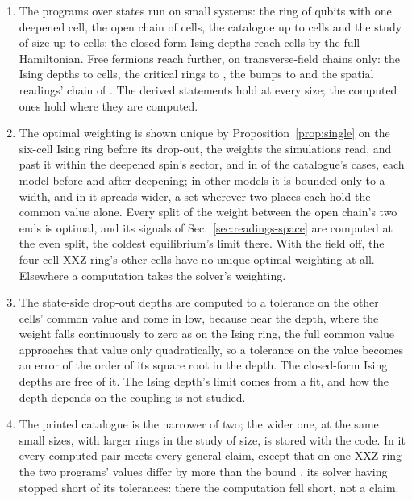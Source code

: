 \documentclass[aps,prd,reprint,superscriptaddress]{revtex4-2}
\begin{document}
\begin{enumerate}
\item The programs over states run on small systems: the ring of  qubits with one deepened cell, the open chain of  cells, the catalogue up to  cells and the study of size up to  cells; the closed-form Ising depths reach  cells by the full Hamiltonian. Free fermions reach further, on transverse-field chains only: the Ising depths to  cells, the critical rings to , the bumps to  and the spatial readings' chain of . The derived statements hold at every size; the computed ones hold where they are computed.
\item The optimal weighting is shown unique by Proposition~\ref{prop:single} on the six-cell Ising ring before its drop-out, the weights the simulations read, and past it within the deepened spin's sector, and in  of the catalogue's  cases, each model before and after deepening; in  other models it is bounded only to a width, and in  it spreads wider, a set wherever two places each hold the common value alone. Every split of the weight between the open chain's two ends is optimal, and its signals of Sec.~\ref{sec:readings-space} are computed at the even split, the coldest equilibrium's limit there. With the field off, the four-cell XXZ ring's other cells have no unique optimal weighting at all. Elsewhere a computation takes the solver's weighting.
\item The state-side drop-out depths are computed to a tolerance on the other cells' common value and come in low, because near the depth, where the weight falls continuously to zero as on the Ising ring, the full common value approaches that value only quadratically, so a tolerance on the value becomes an error of the order of its square root in the depth. The closed-form Ising depths are free of it. The Ising depth's limit comes from a fit, and how the depth depends on the coupling is not studied.
\item The printed catalogue is the narrower of two; the wider one, at the same small sizes, with larger rings in the study of size, is stored with the code. In it every computed pair meets every general claim, except that on one XXZ ring the two programs' values differ by more than the bound , its solver having stopped short of its tolerances: there the computation fell short, not a claim.

\end{enumerate}
\end{document}
